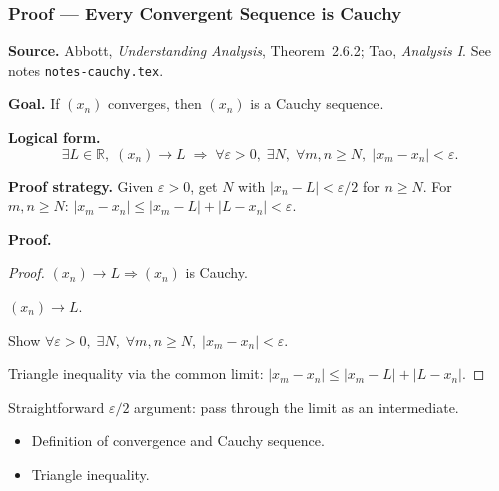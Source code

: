 
\clearpage
{}
\hypertarget{proof-RA-ABB-P-conv-cauchy}{}

\subsubsection[Convergent Implies Cauchy]{Proof --- Every Convergent Sequence is Cauchy}

\bigskip

\noindent
\textbf{Source.}
Abbott, \emph{Understanding Analysis}, Theorem~2.6.2; Tao, \emph{Analysis I}.
See notes \texttt{notes-cauchy.tex}.

\vspace{0.75em}

\noindent
\textbf{Goal.}
If $(x_n)$ converges, then $(x_n)$ is a Cauchy sequence.

\vspace{0.75em}

\noindent
\textbf{Logical form.}
\[
  \exists L \in \mathbb{R},\; (x_n) \to L
  \;\Rightarrow\;
  \forall \varepsilon > 0,\; \exists N,\; \forall m, n \ge N,\;
  |x_m - x_n| < \varepsilon.
\]

\vspace{0.75em}

\noindent
\textbf{Proof strategy.}
Given $\varepsilon > 0$, get $N$ with $|x_n - L| < \varepsilon/2$ for $n \ge N$.
For $m, n \ge N$: $|x_m - x_n| \le |x_m - L| + |L - x_n| < \varepsilon$.

\vspace{0.75em}

\noindent
\textbf{Proof.}
\begin{proof}
\Claim $(x_n) \to L \Rightarrow (x_n)$ is Cauchy.

\Given $(x_n) \to L$.

\Goal Show $\forall \varepsilon > 0,\; \exists N,\; \forall m, n \ge N,\;
|x_m - x_n| < \varepsilon$.

\Strategy Triangle inequality via the common limit: $|x_m - x_n| \le
|x_m - L| + |L - x_n|$.

\medskip



\end{proof}

\begin{remark*}
Straightforward $\varepsilon/2$ argument: pass through the limit as an
intermediate.
\end{remark*}

\begin{remark*}[Dependencies]
\begin{itemize}
  \item Definition of convergence and Cauchy sequence.
  \item Triangle inequality.
\end{itemize}
\end{remark*}
